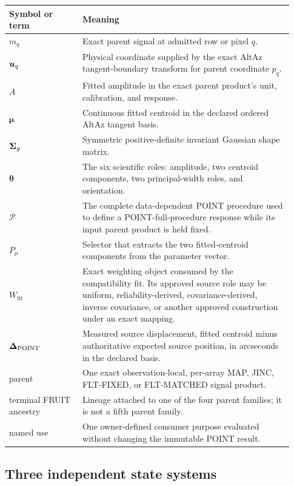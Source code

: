 \begin{longtable}{@{}p{0.24\linewidth}p{0.69\linewidth}@{}}
\toprule
Symbol or term & Meaning \\
\midrule
\endhead
$m_q$ & Exact parent signal at admitted row or pixel $q$. \\
$\boldsymbol{u}_q$ & Physical coordinate supplied by the exact AltAz tangent-boundary transform for parent coordinate $p_q$. \\
$A$ & Fitted amplitude in the exact parent product's unit, calibration, and response. \\
$\boldsymbol{\mu}$ & Continuous fitted centroid in the declared ordered AltAz tangent basis. \\
$\boldsymbol{\Sigma}_{g}$ & Symmetric positive-definite invariant Gaussian shape matrix. \\
$\boldsymbol{\theta}$ & The six scientific roles: amplitude, two centroid components, two principal-width roles, and orientation. \\
$\mathcal{P}$ & The complete data-dependent POINT procedure used to define a POINT-full-procedure response while its input parent product is held fixed. \\
$P_{\mu}$ & Selector that extracts the two fitted-centroid components from the parameter vector. \\
$W_{\mathrm{fit}}$ & Exact weighting object consumed by the compatibility fit. Its approved source role may be uniform, reliability-derived, covariance-derived, inverse covariance, or another approved construction under an exact mapping. \\
$\boldsymbol{\Delta}_{\mathrm{POINT}}$ & Measured source displacement, fitted centroid minus authoritative expected source position, in arcseconds in the declared basis. \\
parent & One exact observation-local, per-array MAP, JINC, FLT-FIXED, or FLT-MATCHED signal product. \\
terminal FRUIT ancestry & Lineage attached to one of the four parent families; it is not a fifth parent family. \\
named use & One owner-defined consumer purpose evaluated without changing the immutable POINT result. \\
\bottomrule
\end{longtable}

\subsection{Three independent state systems}\label{sec:state-axes}

